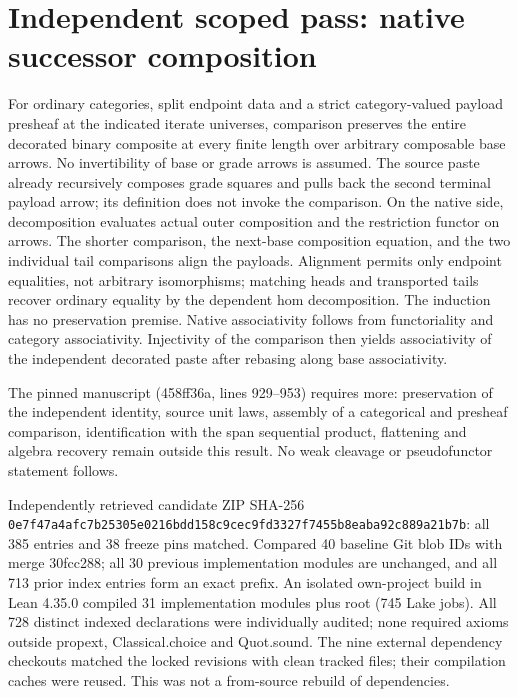 \documentclass{article}
\begin{document}
\section*{Independent scoped pass: native successor composition}
For ordinary categories, split endpoint data and a strict category-valued payload presheaf at the indicated iterate universes, comparison preserves the entire decorated binary composite at every finite length over arbitrary composable base arrows. No invertibility of base or grade arrows is assumed. The source paste already recursively composes grade squares and pulls back the second terminal payload arrow; its definition does not invoke the comparison. On the native side, decomposition evaluates actual outer composition and the restriction functor on arrows. The shorter comparison, the next-base composition equation, and the two individual tail comparisons align the payloads. Alignment permits only endpoint equalities, not arbitrary isomorphisms; matching heads and transported tails recover ordinary equality by the dependent hom decomposition. The induction has no preservation premise. Native associativity follows from functoriality and category associativity. Injectivity of the comparison then yields associativity of the independent decorated paste after rebasing along base associativity.
\par The pinned manuscript (458ff36a, lines 929--953) requires more: preservation of the independent identity, source unit laws, assembly of a categorical and presheaf comparison, identification with the span sequential product, flattening and algebra recovery remain outside this result. No weak cleavage or pseudofunctor statement follows.
\par Independently retrieved candidate ZIP SHA-256 \texttt{0e7f47a4afc7b25305e0216bdd158c9cec9fd3327f7455b8eaba92c889a21b7b}: all 385 entries and 38 freeze pins matched. Compared 40 baseline Git blob IDs with merge 30fcc288; all 30 previous implementation modules are unchanged, and all 713 prior index entries form an exact prefix. An isolated own-project build in Lean 4.35.0 compiled 31 implementation modules plus root (745 Lake jobs). All 728 distinct indexed declarations were individually audited; none required axioms outside propext, Classical.choice and Quot.sound. The nine external dependency checkouts matched the locked revisions with clean tracked files; their compilation caches were reused. This was not a from-source rebuild of dependencies.
\end{document}
